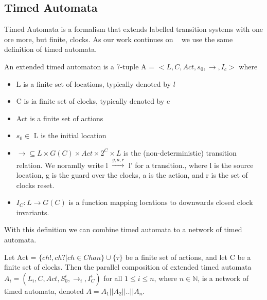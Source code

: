 \documentclass[11pt]{article}
\begin{document}
\subsection{Timed Automata}
Timed Automata is a formalism that extends labelled transition systems with one ore more, but finite, clocks. As our work continues on ~\cite{eemcs21972} we use the same definition of timed automata.
\begin{mydef}
\label{def:TA}
An extended timed automaton is a 7-tuple A = $<L, C, Act, s_0, \rightarrow, I_c>$ where
{\renewcommand\labelitemi{--}
	\begin{itemize}
		\item L is a finite set of locations, typically denoted by $l$
		\item C is ia finite set of clocks, typically denoted by c
		\item Act is a finite set of actions
		\item $s_0 \in$ L is the initial location
		\item $\rightarrow \subseteq L \times G(C) \times Act \times 2^C \times L$ is the (non-deterministic) transition relation. We noramlly write l $\stackrel{g,a,r}{\longrightarrow}$ l' for a transition., where l is the source location, g is the guard over the clocks, a is the action, and r is the set of clocks reset.
		\item $I_C : L \rightarrow G(C)$ is a function mapping locations to downwards closed clock invariants.
	\end{itemize}
}
\end{mydef}

With this definition we can combine timed automata to a network of timed automata.

\begin{mydef}
\label{def:networkTA}
Let Act = $\{ch!,ch?|ch \in Chan\} \cup \{\tau\}$ be a finite set of actions, and let C be a finite set of clocks. Then the parallel composition of extended timed automata $A_i = (L_i, C, Act, S^i_0, \rightarrow_{i}, I^i_C)$ for all $1 \leq i \leq n$, where $n \in \mathbb{N}$, is a network of timed automata, denoted $A = A_1||A_2||..||A_n$.
\end{mydef}
\end{document}
